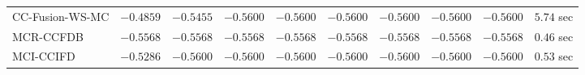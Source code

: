\begin{table}[H]
\begin{tabular}{lrrrrrrrrr}
     CC-Fusion-WS-MC & $      -0.4859$ & $      -0.5455$ & $      -0.5600$ & $      -0.5600$ & $      -0.5600$ & $      -0.5600$ & $      -0.5600$ & $      -0.5600$ & $         5.74$ sec   \\ 
\cmidrule{1-1} 
           MCR-CCFDB & $      -0.5568$ & $      -0.5568$ & $      -0.5568$ & $      -0.5568$ & $      -0.5568$ & $      -0.5568$ & $      -0.5568$ & $      -0.5568$ & $         0.46$ sec   \\ 
\cmidrule{1-1} 
           MCI-CCIFD & $      -0.5286$ & $      -0.5600$ & $      -0.5600$ & $      -0.5600$ & $      -0.5600$ & $      -0.5600$ & $      -0.5600$ & $      -0.5600$ & $         0.53$ sec   \\ 
\bottomrule
\end{tabular}
\end{table}

